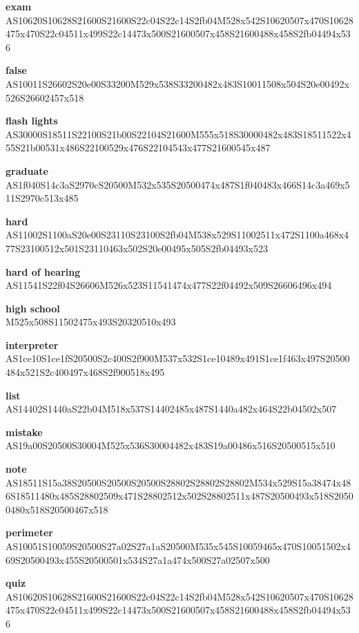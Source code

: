 \documentclass{article}
\begin{document}
\begin{glossary}
\textbf{exam}\\
AS10620S10628S21600S21600S22c04S22c14S2fb04M528x542S10620507x470S10628475x470S22c04511x499S22c14473x500S21600507x458S21600488x458S2fb04494x536

\textbf{false}\\
AS10011S26602S20e00S33200M529x538S33200482x483S10011508x504S20e00492x526S26602457x518

\textbf{flash lights}\\
AS30000S18511S22100S21b00S22104S21600M555x518S30000482x483S18511522x455S21b00531x486S22100529x476S22104543x477S21600545x487

\textbf{graduate}\\
AS1f040S14c3aS2970cS20500M532x535S20500474x487S1f040483x466S14c3a469x511S2970c513x485

\textbf{hard}\\
AS11002S1100aS20e00S23110S23100S2fb04M538x529S11002511x472S1100a468x477S23100512x501S23110463x502S20e00495x505S2fb04493x523

\textbf{hard of hearing}\\
AS11541S22f04S26606M526x523S11541474x477S22f04492x509S26606496x494

\textbf{high school}\\
M525x508S11502475x493S20320510x493

\textbf{interpreter}\\
AS1ce10S1ce1fS20500S2c400S2f900M537x532S1ce10489x491S1ce1f463x497S20500484x521S2c400497x468S2f900518x495

\textbf{list}\\
AS14402S1440aS22b04M518x537S14402485x487S1440a482x464S22b04502x507

\textbf{mistake}\\
AS19a00S20500S30004M525x536S30004482x483S19a00486x516S20500515x510

\textbf{note}\\
AS18511S15a38S20500S20500S20500S28802S28802S28802M534x529S15a38474x486S18511480x485S28802509x471S28802512x502S28802511x487S20500493x518S20500480x518S20500467x518

\textbf{perimeter}\\
AS10051S10059S20500S27a02S27a1aS20500M535x545S10059465x470S10051502x469S20500493x455S20500501x534S27a1a474x500S27a02507x500

\textbf{quiz}\\
AS10620S10628S21600S21600S22c04S22c14S2fb04M528x542S10620507x470S10628475x470S22c04511x499S22c14473x500S21600507x458S21600488x458S2fb04494x536


\end{glossary}
\end{document}
